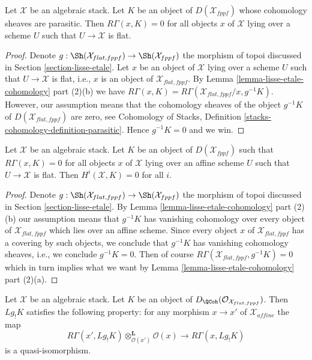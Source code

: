 \begin{lemma}
\label{lemma-cohomology-parasitic}
Let $\mathcal{X}$ be an algebraic stack. Let $K$ be an object of
$D(\mathcal{X}_{fppf})$ whose cohomology sheaves are parasitic. Then
$R\Gamma(x, K) = 0$ for all objects $x$ of $\mathcal{X}$ lying
over a scheme $U$ such that $U \to \mathcal{X}$ is flat.
\end{lemma}

\begin{proof}
Denote $g : \Sh(\mathcal{X}_{flat, fppf}) \to \Sh(\mathcal{X}_{fppf})$
the morphism of topoi discussed in Section \ref{section-lisse-etale}.
Let $x$ be an object of $\mathcal{X}$ lying over a scheme $U$
such that $U \to \mathcal{X}$ is flat, i.e., $x$ is an object
of $\mathcal{X}_{flat, fppf}$.
By Lemma \ref{lemma-lisse-etale-cohomology} part (2)(b) we have
$R\Gamma(x, K) = R\Gamma(\mathcal{X}_{flat, fppf}/x, g^{-1}K)$.
However, our assumption means that the cohomology sheaves
of the object $g^{-1}K$ of $D(\mathcal{X}_{flat, fppf})$ are zero, see
Cohomology of Stacks, Definition \ref{stacks-cohomology-definition-parasitic}.
Hence $g^{-1}K = 0$ and we win.
\end{proof}

\begin{lemma}
\label{lemma-cohomology-parasitic-complex}
Let $\mathcal{X}$ be an algebraic stack. Let $K$ be an object of
$D(\mathcal{X}_{fppf})$ such that $R\Gamma(x, K) = 0$ for all objects
$x$ of $\mathcal{X}$ lying over an affine scheme $U$ such that
$U \to \mathcal{X}$ is flat. Then $H^i(\mathcal{X}, K) = 0$ for all $i$.
\end{lemma}

\begin{proof}
Denote $g : \Sh(\mathcal{X}_{flat, fppf}) \to \Sh(\mathcal{X}_{fppf})$
the morphism of topoi discussed in Section \ref{section-lisse-etale}.
By Lemma \ref{lemma-lisse-etale-cohomology} part (2)(b) our assumption
means that $g^{-1}K$ has vanishing cohomology over every object
of $\mathcal{X}_{flat, fppf}$ which lies over an affine scheme.
Since every object $x$ of $\mathcal{X}_{flat, fppf}$ has a covering
by such objects, we conclude that $g^{-1}K$ has vanishing cohomology
sheaves, i.e., we conclude $g^{-1}K = 0$. Then of course
$R\Gamma(\mathcal{X}_{flat, fppf}, g^{-1}K) = 0$ which in turn implies
what we want by Lemma \ref{lemma-lisse-etale-cohomology} part (2)(a).
\end{proof}

\begin{lemma}
\label{lemma-higher-shriek-QC}
Let $\mathcal{X}$ be an algebraic stack. Let $K$ be an object of
$D_\QCoh(\mathcal{O}_{\mathcal{X}_{flat, fppf}})$. Then $Lg_!K$ satisfies
the following property: for any morphism $x \to x'$ of
$\mathcal{X}_{affine}$ the map
$$
R\Gamma(x', Lg_!K) \otimes_{\mathcal{O}(x')}^\mathbf{L} \mathcal{O}(x)
\longrightarrow
R\Gamma(x, Lg_!K)
$$
is a quasi-isomorphism.
\end{lemma}

